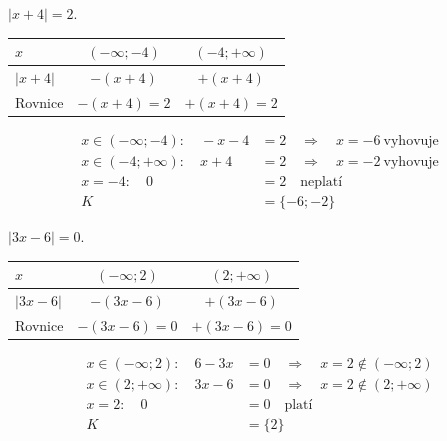 \documentclass[11pt,a4paper]{article}
\begin{document}
\begin{zadaniReseniBox}[title={Samostatná práce 1}]
$|x+4|=2$.
\tcblower
\begin{center}
\begingroup\footnotesize
\renewcommand{\arraystretch}{1.32}
\begin{tabular}{@{}lcc@{}}
\toprule
$x$ & $(-\infty;-4)$ & $(-4;+\infty)$ \\
\midrule
$|x + 4|$ & $-(x + 4)$ & $+(x + 4)$ \\
\midrule
Rovnice & $-(x + 4)=2$ & $+(x + 4)=2$ \\
\bottomrule
\end{tabular}
\endgroup
\end{center}
\[\begin{aligned}x\in (-\infty;-4):\quad - x - 4 &= 2\quad\Longrightarrow\quad x=-6\ \text{vyhovuje}\\[2pt]
x\in (-4;+\infty):\quad x + 4 &= 2\quad\Longrightarrow\quad x=-2\ \text{vyhovuje}\\[2pt]
x=-4:\quad 0 &= 2\quad\text{neplatí}\\[2pt]
K&=\{-6;-2\}\end{aligned}\]
\end{zadaniReseniBox}
\begin{zadaniReseniBox}[title={Samostatná práce 2}]
$|3x-6|=0$.
\tcblower
\begin{center}
\begingroup\footnotesize
\renewcommand{\arraystretch}{1.32}
\begin{tabular}{@{}lcc@{}}
\toprule
$x$ & $(-\infty;2)$ & $(2;+\infty)$ \\
\midrule
$|3 x - 6|$ & $-(3 x - 6)$ & $+(3 x - 6)$ \\
\midrule
Rovnice & $-(3 x - 6)=0$ & $+(3 x - 6)=0$ \\
\bottomrule
\end{tabular}
\endgroup
\end{center}
\[\begin{aligned}x\in (-\infty;2):\quad 6 - 3 x &= 0\quad\Longrightarrow\quad x=2\notin (-\infty;2)\\[2pt]
x\in (2;+\infty):\quad 3 x - 6 &= 0\quad\Longrightarrow\quad x=2\notin (2;+\infty)\\[2pt]
x=2:\quad 0 &= 0\quad\text{platí}\\[2pt]
K&=\{2\}\end{aligned}\]
\end{zadaniReseniBox}
\end{document}
